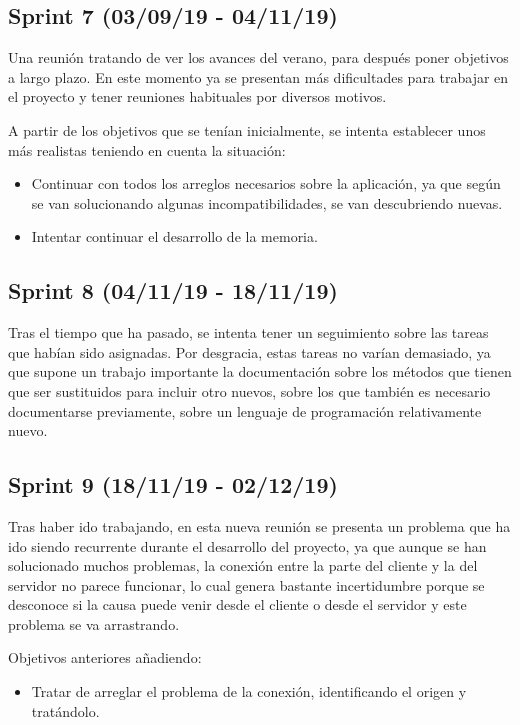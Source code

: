 \subsection{Sprint 7 (03/09/19 - 04/11/19)}

Una reunión tratando de ver los avances del verano, para después poner objetivos a largo plazo. En este momento ya se presentan más dificultades para trabajar en el proyecto y tener reuniones habituales por diversos motivos.

A partir de los objetivos que se tenían inicialmente, se intenta establecer unos más realistas teniendo en cuenta la situación:

\begin{itemize}
\item Continuar con todos los arreglos necesarios sobre la aplicación, ya que según se van solucionando algunas incompatibilidades, se van descubriendo nuevas.
\item Intentar continuar el desarrollo de la memoria.
\end{itemize}

\subsection{Sprint 8 (04/11/19 - 18/11/19)}

Tras el tiempo que ha pasado, se intenta tener un seguimiento sobre las tareas que habían sido asignadas. Por desgracia, estas tareas no varían demasiado, ya que supone un trabajo importante la documentación sobre los métodos que tienen que ser sustituidos para incluir otro nuevos, sobre los que también es necesario documentarse previamente, sobre un lenguaje de programación relativamente nuevo.

\subsection{Sprint 9 (18/11/19 - 02/12/19)}

Tras haber ido trabajando, en esta nueva reunión se presenta un problema que ha ido siendo recurrente durante el desarrollo del proyecto, ya que aunque se han solucionado muchos problemas, la conexión entre la parte del cliente y la del servidor no parece funcionar, lo cual genera bastante incertidumbre porque se desconoce si la causa puede venir desde el cliente o desde el servidor y este problema se va arrastrando.

Objetivos anteriores añadiendo:

\begin{itemize}
\item Tratar de arreglar el problema de la conexión, identificando el origen y tratándolo.
\end{itemize}

